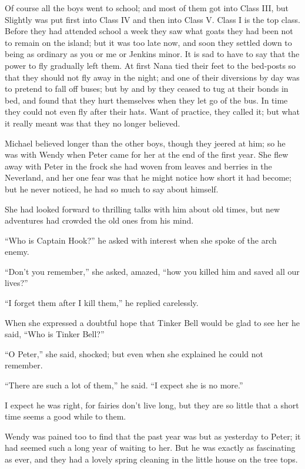 Of course all the boys went to school;
and most of them got into Class III,
but Slightly was put first into Class IV and then into Class V\@.
Class I is the top class.
Before they had attended school a week they saw what goats they had been not to remain on the island;
but it was too late now, and soon they settled down to being as ordinary as you or me or Jenkins minor.
It is sad to have to say that the power to fly gradually left them.
At first Nana tied their feet to the bed-posts so that they should not fly away in the night;
and one of their diversions by day was to pretend to fall off buses;
but by and by they ceased to tug at their bonds in bed,
and found that they hurt themselves when they let go of the bus.
In time they could not even fly after their hats.
Want of practice, they called it;
but what it really meant was that they no longer believed.

Michael believed longer than the other boys, though they jeered at him;
so he was with Wendy when Peter came for her at the end of the first year.
She flew away with Peter in the frock she had woven from leaves and berries in the Neverland,
and her one fear was that he might notice how short it had become;
but he never noticed, he had so much to say about himself.

She had looked forward to thrilling talks with him about old times,
but new adventures had crowded the old ones from his mind.

“Who is Captain Hook?\@” he asked with interest when she spoke of the arch enemy.

“Don’t you remember,” she asked, amazed, “how you killed him and saved all our lives?”

“I forget them after I kill them,” he replied carelessly.

When she expressed a doubtful hope that Tinker Bell would be glad to see her
he said, “Who is Tinker Bell?”

“O Peter,” she said, shocked;
but even when she explained he could not remember.

“There are such a lot of them,” he said.
“I expect she is no more.”

I expect he was right, for fairies don’t live long,
but they are so little that a short time seems a good while to them.

Wendy was pained too to find that the past year was but as yesterday to Peter;
it had seemed such a long year of waiting to her.
But he was exactly as fascinating as ever,
and they had a lovely spring cleaning in the little house on the tree tops.

